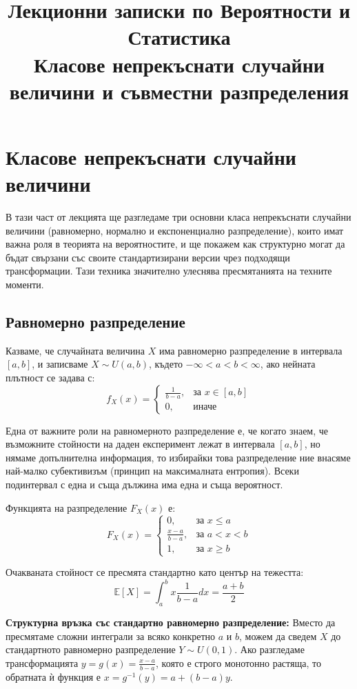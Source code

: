 \documentclass{article}
\title{Лекционни записки по Вероятности и Статистика\\ \large Класове непрекъснати случайни величини и съвместни разпределения}
\author{}
\date{}
\begin{document}
\maketitle

\section{Класове непрекъснати случайни величини}

В тази част от лекцията ще разгледаме три основни класа непрекъснати случайни величини (равномерно, нормално и експоненциално разпределение), които имат важна роля в теорията на вероятностите, и ще покажем как структурно могат да бъдат свързани със своите стандартизирани версии чрез подходящи трансформации. Тази техника значително улеснява пресмятанията на техните моменти.

\subsection{Равномерно разпределение}

Казваме, че случайната величина $X$ има равномерно разпределение в интервала $[a, b]$, и записваме $X \sim U(a, b)$, където $-\infty < a < b < \infty$, ако нейната плътност се задава с:
\[
f_X(x) = 
\begin{cases} 
\frac{1}{b-a}, & \text{за } x \in [a, b] \\ 
0, & \text{иначе} 
\end{cases}
\]

Една от важните роли на равномерното разпределение е, че когато знаем, че възможните стойности на даден експеримент лежат в интервала $[a, b]$, но нямаме допълнителна информация, то избирайки това разпределение ние внасяме най-малко субективизъм (принцип на максималната ентропия). Всеки подинтервал с една и съща дължина има една и съща вероятност.

Функцията на разпределение $F_X(x)$ е:
\[
F_X(x) = 
\begin{cases} 
0, & \text{за } x \le a \\ 
\frac{x-a}{b-a}, & \text{за } a < x < b \\ 
1, & \text{за } x \ge b 
\end{cases}
\]

Очакваната стойност се пресмята стандартно като център на тежестта:
\[
\mathbb{E}[X] = \int_{a}^{b} x \frac{1}{b-a} dx = \frac{a+b}{2}
\]

\textbf{Структурна връзка със стандартно равномерно разпределение:} 
Вместо да пресмятаме сложни интеграли за всяко конкретно $a$ и $b$, можем да сведем $X$ до стандартното равномерно разпределение $Y \sim U(0, 1)$. Ако разгледаме трансформацията $y = g(x) = \frac{x-a}{b-a}$, която е строго монотонно растяща, то обратната ѝ функция е $x = g^{-1}(y) = a + (b-a)y$. 
\end{document}
